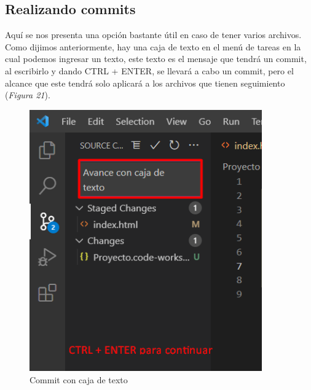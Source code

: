 \subsection{Realizando commits}
\hspace{0.55cm}Aquí se nos presenta una opción bastante útil en caso de tener varios archivos. Como dijimos anteriormente, hay una caja de texto en el menú de tareas en la cual podemos ingresar un texto, este texto es el mensaje que tendrá un commit, al escribirlo y dando CTRL + ENTER, se llevará a cabo un commit, pero el alcance que este tendrá solo aplicará a los archivos que tienen seguimiento (\textit{Figura 21}).
\begin{figure}[H]
    \begin{center}
        \caption{Commit con caja de texto}
        \label{fig: 21}
        \includegraphics[width=10cm]{capturas/commits1.png}
    \end{center}
\end{figure}

